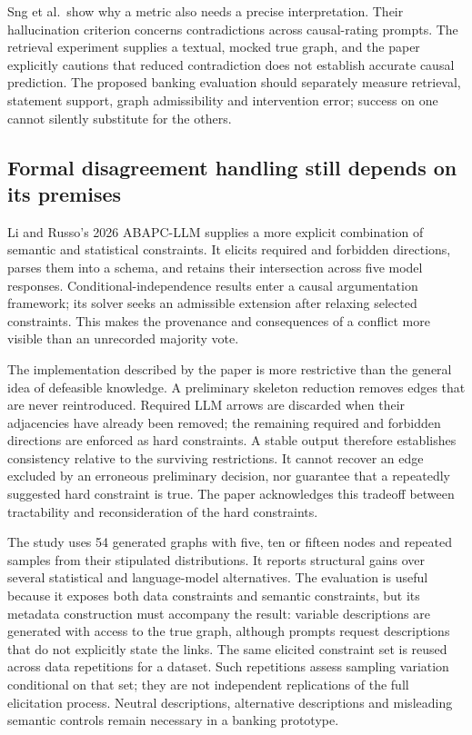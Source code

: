 Sng et al.~show why a metric also needs a precise interpretation. Their
hallucination criterion concerns contradictions across causal-rating
prompts. The retrieval experiment supplies a textual, mocked true graph,
and the paper explicitly cautions that reduced contradiction does not
establish accurate causal prediction. The proposed banking evaluation
should separately measure retrieval, statement support, graph
admissibility and intervention error; success on one cannot silently
substitute for the others. \citep{exec13_hallucination}

\hypertarget{formal-disagreement-handling-still-depends-on-its-premises}{%
\subsection{Formal disagreement handling still depends on its
premises}\label{formal-disagreement-handling-still-depends-on-its-premises}}

Li and Russo's 2026 ABAPC-LLM supplies a more explicit combination of
semantic and statistical constraints. It elicits required and forbidden
directions, parses them into a schema, and retains their intersection
across five model responses. Conditional-independence results enter a
causal argumentation framework; its solver seeks an admissible extension
after relaxing selected constraints. This makes the provenance and
consequences of a conflict more visible than an unrecorded majority
vote. \citep{exec14_expert_argumentation}

The implementation described by the paper is more restrictive than the
general idea of defeasible knowledge. A preliminary skeleton reduction
removes edges that are never reintroduced. Required LLM arrows are
discarded when their adjacencies have already been removed; the
remaining required and forbidden directions are enforced as hard
constraints. A stable output therefore establishes consistency relative
to the surviving restrictions. It cannot recover an edge excluded by an
erroneous preliminary decision, nor guarantee that a repeatedly
suggested hard constraint is true. The paper acknowledges this tradeoff
between tractability and reconsideration of the hard constraints.
\citep{exec14_expert_argumentation}

The study uses 54 generated graphs with five, ten or fifteen nodes and
repeated samples from their stipulated distributions. It reports
structural gains over several statistical and language-model
alternatives. The evaluation is useful because it exposes both data
constraints and semantic constraints, but its metadata construction must
accompany the result: variable descriptions are generated with access to
the true graph, although prompts request descriptions that do not
explicitly state the links. The same elicited constraint set is reused
across data repetitions for a dataset. Such repetitions assess sampling
variation conditional on that set; they are not independent replications
of the full elicitation process. Neutral descriptions, alternative
descriptions and misleading semantic controls remain necessary in a
banking prototype. \citep{exec14_expert_argumentation}

